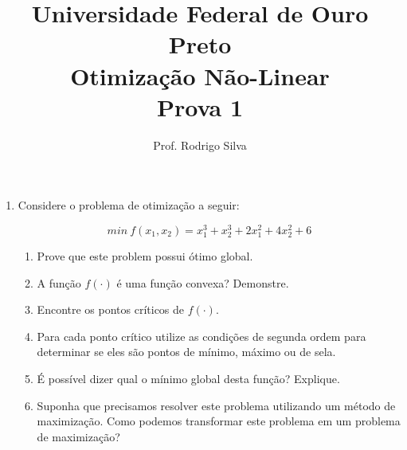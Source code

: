\documentclass{article}
\title{\vspace{-2 cm}Universidade Federal de Ouro Preto \\ Otimização Não-Linear \\ Prova 1}
\author{Prof. Rodrigo Silva}
\date{}
\begin{document}
\maketitle


\begin{enumerate}

\item Considere o problema de otimização a seguir:

\begin{equation}
     min\ f(x_1,x_2) = x_1^3 + x_2^3 + 2x_1^2 + 4x_2^2 + 6
\end{equation}

\begin{enumerate}
    \item Prove que este problem possui ótimo global.
    \item A função $f(\cdot)$ é uma função convexa? Demonstre.
    \item Encontre os pontos críticos de $f(\cdot)$.
    \item Para cada ponto crítico utilize as condições de segunda ordem para determinar se eles são pontos de mínimo, máximo ou de sela.
    \item É possível dizer qual o mínimo global desta função? Explique.
    \item Suponha que precisamos resolver este problema utilizando um método de maximização. Como podemos transformar este problema em um problema de maximização?
\end{enumerate}

\end{enumerate}
\end{document}
